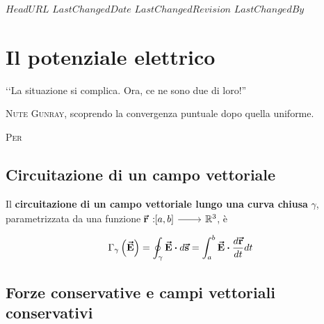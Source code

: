 \svnidlong
{$HeadURL$}
{$LastChangedDate$}
{$LastChangedRevision$}
{$LastChangedBy$}

\chapter{Il potenziale elettrico} %
\begin{introduction}
	‘‘La situazione si complica. Ora, ce ne sono due di loro!''
	\begin{flushright}
		\textsc{Nute Gunray,} scoprendo la convergenza puntuale dopo quella uniforme. %
	\end{flushright}
\end{introduction}
\lettrine[findent=1pt, nindent=0pt]{P}{er}  %
\section{Circuitazione di un campo vettoriale}
\begin{define}
	Il \textbf{circuitazione di un campo vettoriale lungo una curva chiusa} $\gamma$, parametrizzata da una funzione $\funz[\vba{r}]{\left[a,b\right]}{\realset^3}$, è
	\begin{equation}
		\Gamma_{\gamma}\left(\vba{E}\right)=\oint_{\gamma}\vba{E}\vdot d\vba{s}=\int_{a}^b\vba{E}\vdot\frac{d\vba{r}}{dt}dt
	\end{equation}
\end{define}
\section{Forze conservative e campi vettoriali conservativi}
